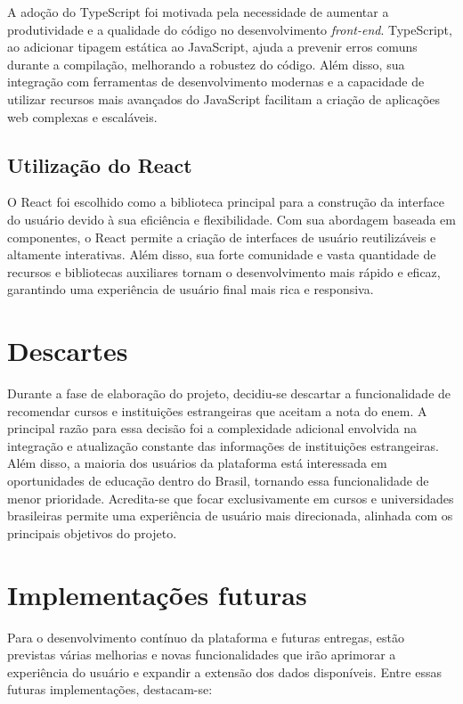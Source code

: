 A adoção do TypeScript foi motivada pela necessidade de aumentar a produtividade e a qualidade do código no desenvolvimento \textit{front-end}. TypeScript, ao adicionar tipagem estática ao JavaScript, ajuda a prevenir erros comuns durante a compilação, melhorando a robustez do código. Além disso, sua integração com ferramentas de desenvolvimento modernas e a capacidade de utilizar recursos mais avançados do JavaScript facilitam a criação de aplicações web complexas e escaláveis.

\subsection{Utilização do React}

O React foi escolhido como a biblioteca principal para a construção da interface do usuário devido à sua eficiência e flexibilidade. Com sua abordagem baseada em componentes, o React permite a criação de interfaces de usuário reutilizáveis e altamente interativas. Além disso, sua forte comunidade e vasta quantidade de recursos e bibliotecas auxiliares tornam o desenvolvimento mais rápido e eficaz, garantindo uma experiência de usuário final mais rica e responsiva.

\section{Descartes}

Durante a fase de elaboração do projeto, decidiu-se descartar a funcionalidade de recomendar cursos e instituições estrangeiras que aceitam a nota do \ac{enem}. A principal razão para essa decisão foi a complexidade adicional envolvida na integração e atualização constante das informações de instituições estrangeiras. Além disso, a maioria dos usuários da plataforma está interessada em oportunidades de educação dentro do Brasil, tornando essa funcionalidade de menor prioridade. Acredita-se que focar exclusivamente em cursos e universidades brasileiras permite uma experiência de usuário mais direcionada, alinhada com os principais objetivos do projeto.


\section{Implementações futuras}

Para o desenvolvimento contínuo da plataforma e futuras entregas, estão previstas várias melhorias e novas funcionalidades que irão aprimorar a experiência do usuário e expandir a extensão dos dados disponíveis. Entre essas futuras implementações, destacam-se:

